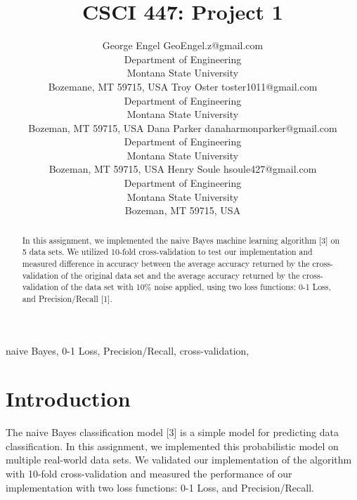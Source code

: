 \documentclass[twoside,11pt]{article}
\begin{document}
\title{CSCI 447: Project 1}

\author{\name George Engel \email GeoEngel.z@gmail.com \\
       \addr Department of Engineering\\
       Montana State University\\
       Bozemane, MT 59715, USA
       \AND
       \name Troy Oster \email toster1011@gmail.com \\
       \addr Department of Engineering\\
       Montana State University\\
       Bozeman, MT 59715, USA
       \AND
       \name Dana Parker \email danaharmonparker@gmail.com \\
       \addr Department of Engineering\\
       Montana State University\\
       Bozeman, MT 59715, USA
       \AND
       \name Henry Soule \email hsoule427@gmail.com \\
       \addr Department of Engineering\\
       Montana State University\\
       Bozeman, MT 59715, USA}


\maketitle

\begin{abstract}%

In this assignment, we implemented the naive Bayes machine learning algorithm [3] on 5 data sets. We utilized 10-fold cross-validation to test our implementation and measured difference in accuracy between the average accuracy returned by the cross-validation of the original data set and the average accuracy returned by the cross-validation of the data set with 10\% noise applied, using two loss functions: 0-1 Loss, and Precision/Recall [1]. 

\end{abstract}

\begin{keywords}
    naive Bayes, 0-1 Loss, Precision/Recall, cross-validation, 
\end{keywords}

\section{Introduction}
The naive Bayes classification model [3] is a simple model for predicting data classification. In this assignment, we implemented this probabilistic model on multiple real-world data sets. We validated our implementation of the algorithm with 10-fold cross-validation and measured the performance of our implementation with two loss functions: 0-1 Loss, and Precision/Recall.
\end{document}
